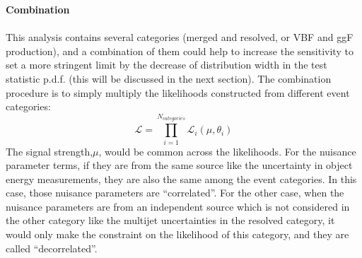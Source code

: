 \noindent
{\bf Combination}
\\
\\This analysis contains several categories (merged and resolved, or VBF and ggF production), and a combination of them could help to increase the sensitivity to set a more stringent limit by the decrease of distribution width in the test statistic p.d.f. (this will be discussed in the next section). The combination procedure is to simply multiply the likelihoods constructed from different event categories\cite{asymptotics}:
\begin{equation}
\mathcal{L}=\displaystyle\prod_{i=1}^{N_{categories}} \mathcal{L}_{i}(\mu, \theta_i)
\end{equation}
The signal strength,$\mu$, would be common across the likelihoods. For the nuisance parameter terms, if they are from the same source like the uncertainty in object energy measurements, they are also the same among the event categories. In this case, those nuisance parameters are ``correlated''. For the other case, when the nuisance parameters are from an independent source which is not considered in the other category like the multijet uncertainties in the resolved category, it would only make the constraint on the likelihood of this category, and they are called ``decorrelated''.  
